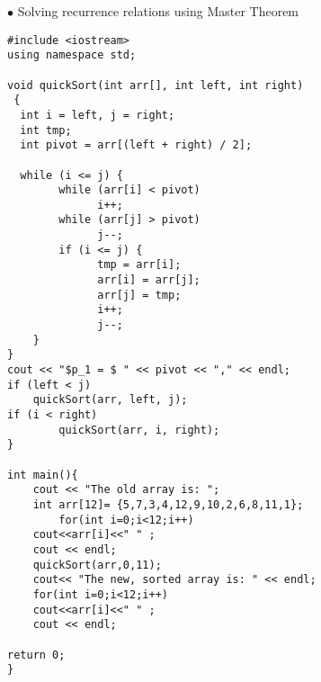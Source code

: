 \documentclass[11pt]{article} %
\begin{document}
\indent\indent$\bullet$ Solving recurrence relations using Master Theorem
\\
\newpage
{}
\begin{verbatim}
#include <iostream>
using namespace std;

void quickSort(int arr[], int left, int right)
 {
  int i = left, j = right;
  int tmp;
  int pivot = arr[(left + right) / 2];

  while (i <= j) {
        while (arr[i] < pivot)
              i++;
        while (arr[j] > pivot)
              j--;
        if (i <= j) {
              tmp = arr[i];
              arr[i] = arr[j];
              arr[j] = tmp;
              i++;
              j--;
    }
}
cout << "$p_1 = $ " << pivot << "," << endl; 
if (left < j)
    quickSort(arr, left, j);
if (i < right)
        quickSort(arr, i, right);
}

int main(){
    cout << "The old array is: ";
    int arr[12]= {5,7,3,4,12,9,10,2,6,8,11,1};
        for(int i=0;i<12;i++)
    cout<<arr[i]<<" " ;
    cout << endl; 
    quickSort(arr,0,11);
    cout<< "The new, sorted array is: " << endl;
    for(int i=0;i<12;i++)
    cout<<arr[i]<<" " ;
    cout << endl;

return 0;
}
\end{verbatim}
\end{document}
